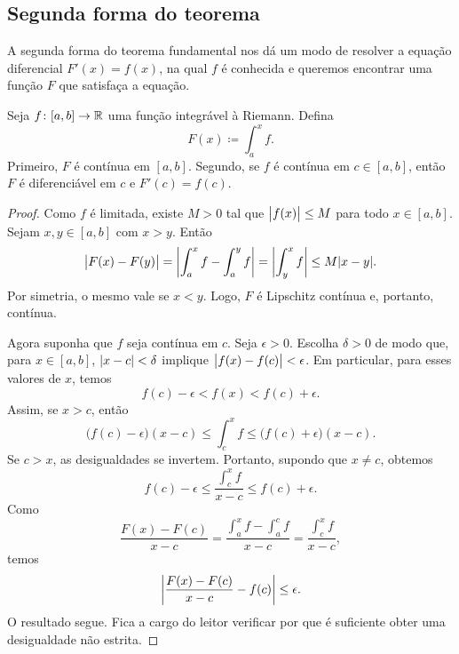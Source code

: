 \subsection{Segunda forma do teorema}

A segunda forma do teorema fundamental nos dá um modo de resolver
a equação diferencial $F'(x) = f(x)$, na qual $f$ é conhecida e queremos
encontrar uma função $F$ que satisfaça a equação.

\begin{thm} \label{thm:FTCv2}
Seja $f \colon [a,b] \to {\mathbb{R}}$ uma função integrável à Riemann. Defina
\begin{equation*}
F(x) \coloneqq \int_a^x f .
\end{equation*}
Primeiro, $F$ é contínua em $[a,b]$. Segundo,
se $f$ é contínua em $c \in [a,b]$, então $F$ é diferenciável em $c$
e $F'(c) = f(c)$.
\end{thm}

\begin{proof}
Como $f$ é limitada, existe $M > 0$
tal que $\bigl\lvert {f(x)} \bigr\rvert \leq M$ para todo $x \in [a,b]$. Sejam $x,y \in [a,b]$
com $x > y$. Então
\begin{equation*}
\bigl\lvert {F(x)-F(y)} \bigr\rvert =
\left\lvert {\int_a^x f - \int_a^y f} \right\rvert
=
\left\lvert {\int_y^x f} \right\rvert
\leq
M\lvert {x-y} \rvert .
\end{equation*}
Por simetria, o mesmo vale se $x < y$.
Logo, $F$ é Lipschitz contínua e, portanto, contínua.

Agora suponha que $f$ seja contínua em $c$.
Seja $\epsilon > 0$. Escolha $\delta > 0$ de modo que, para $x \in [a,b]$,
$\lvert {x-c} \rvert < \delta$ implique $\bigl\lvert {f(x)-f(c)} \bigr\rvert < \epsilon$.
Em particular, para esses valores de $x$, temos
\begin{equation*}
f(c)-\epsilon < f(x) < f(c) + \epsilon.
\end{equation*}
Assim, se $x > c$, então
\begin{equation*}
\bigl(f(c)-\epsilon\bigr) (x-c) \leq \int_c^x f \leq
\bigl(f(c) + \epsilon\bigr)(x-c).
\end{equation*}
Se $c > x$, as desigualdades se invertem. Portanto,
supondo que $x \neq c$, obtemos
\begin{equation*}
f(c)-\epsilon
\leq
\frac{\int_c^{x} f}{x-c}
\leq
f(c)+\epsilon .
\end{equation*}
Como
\begin{equation*}
\frac{F(x)-F(c)}{x-c}
=
\frac{\int_a^{x} f - \int_a^{c} f}{x-c}
=
\frac{\int_c^{x} f}{x-c} ,
\end{equation*}
temos
\begin{equation*}
\left\lvert {\frac{F(x)-F(c)}{x-c} - f(c)} \right\rvert \leq \epsilon .
\end{equation*}
O resultado segue. Fica a cargo do leitor verificar por que é suficiente
obter uma desigualdade não estrita.
\end{proof}

